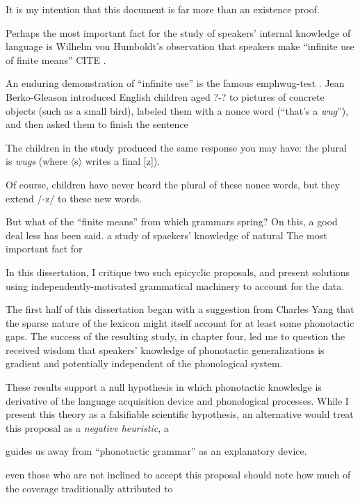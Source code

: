 It is my intention that this document is far more than an existence proof.

Perhaps the most important fact for the study of speakers' internal knowledge of language is Wilhelm von Humboldt's observation that speakers make ``infinite use of finite means'' CITE \citep{Chomsky1966}. 

An enduring demonstration of ``infinite use'' is the famous emph{wug-test} \citep{Berko1958}. Jean Berko-Gleason introduced English children aged ?-? to pictures of concrete objects (such as a small bird), labeled them with a nonce word (``that's a \emph{wug}''), and then asked them to finish the sentence

The children in the study produced the same response you may have: the plural is \emph{wugs} (where $\langle$s$\rangle$ writes a final [z]). 

Of course, children have never heard the plural of these nonce words, but they extend /-z/ to these new words. 

But what of the ``finite means'' from which grammars spring? On this, a good deal less has been said.
a study of spaekers' knowledge of natural
The most important fact for 

In this dissertation, I critique two such epicyclic proposals, and present solutions using independently-motivated grammatical machinery to account for the data. 

The first half of this dissertation began with a suggestion from Charles Yang that the sparse nature of the lexicon might itself account for at least some phonotactic gaps. The success of the resulting study, in chapter four, led me to question the received wisdom that speakers' knowledge of phonotactic generalizations is gradient and potentially independent of the phonological system. 

These results support a null hypothesis in which phonotactic knowledge is derivative of the language acquisition device and phonological processes. While I present this theory as a falsifiable scientific hypothesis, an alternative would treat this proposal as a \emph{negative heuristic}, a 

guides us away from ``phonotactic grammar'' as an explanatory device. 

even those who are not inclined to accept this proposal should note how much of the coverage traditionally attributed to
